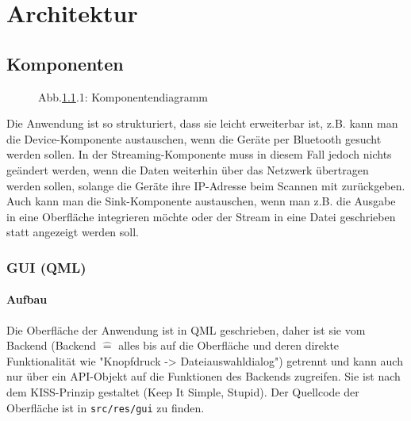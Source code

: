 \documentclass{article}
\begin{document}
    \newpage


    \section{Architektur}\label{sec:architektur}

    \subsection{Komponenten}\label{subsec:komponenten}

    \begin{figure}[!h]
        \centering
        {
        \svgfont
        \resizebox{\textwidth}{!}{}
        }
        \caption*{Abb.\ref{subsec:komponenten}.1: Komponentendiagramm}
    \end{figure}

    Die Anwendung ist so strukturiert, dass sie leicht erweiterbar ist, z.B.
    kann man die Device-Komponente austauschen, wenn die Geräte per Bluetooth gesucht werden sollen.
    In der Streaming-Komponente muss in diesem Fall jedoch nichts geändert werden, wenn die
    Daten weiterhin über das Netzwerk übertragen werden sollen, solange die Geräte ihre IP-Adresse beim Scannen mit zurückgeben.
    Auch kann man die Sink-Komponente austauschen, wenn man z.B. die Ausgabe in eine Oberfläche integrieren möchte oder
    der Stream in eine Datei geschrieben statt angezeigt werden soll.

    \subsubsection{GUI (QML)}\label{subsubsec:gui-(qml)}

    \paragraph{Aufbau}
    Die Oberfläche der Anwendung ist in QML geschrieben, daher ist sie vom Backend
    (Backend $\hat=$ alles bis auf die Oberfläche und deren direkte Funktionalität wie "Knopfdruck -> Dateiauswahldialog")
    getrennt und kann auch nur über ein API-Objekt auf die Funktionen des Backends zugreifen.
    Sie ist nach dem KISS-Prinzip gestaltet (Keep It Simple, Stupid).
    Der Quellcode der Oberfläche ist in \texttt{src/res/gui} zu finden.
\end{document}
